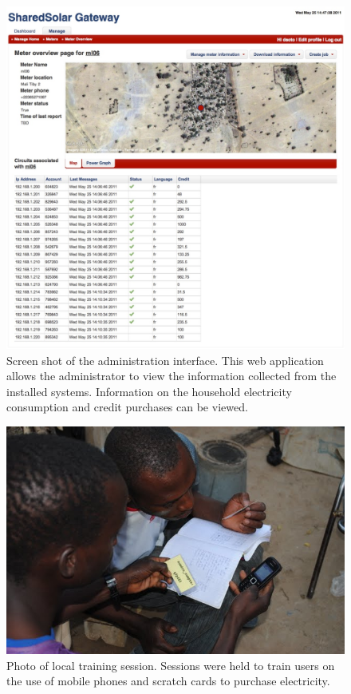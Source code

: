 \documentclass[conference]{IEEEtran}
\begin{document}
\begin{figure}[]
\begin{center}
\includegraphics[width=\columnwidth]{figures/gateway.jpg}
\end{center}
\caption{Screen shot of the administration interface.  This web application allows
the administrator to view the information collected from the installed systems.  Information
on the household electricity consumption and credit purchases can be viewed.  }
\label{gateway}
\end{figure}

\begin{figure}[]
\begin{center}
\includegraphics[width=\columnwidth]{figures/training.jpg}
\end{center}
\caption{Photo of local training session.  Sessions were held to train users on the use
of mobile phones and scratch cards to purchase electricity.}
\label{training}
\end{figure}
\end{document}
